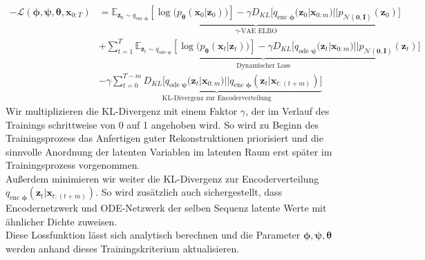 \documentclass[12pt]{article}
\newcommand{\E}{\mathbb{E}}
\newcommand{\z}{\mathbf{z}}
\begin{document}
	\begin{align*}
	-\mathcal{L}(\boldsymbol\phi,\boldsymbol\psi,\boldsymbol\theta,\mathbf{x}_{0:T}) &=\underbrace{\E_{\mathbf{z}_{0}\sim q_{\text{enc }\boldsymbol\phi}}
		\left[\log\big(p_{\boldsymbol\theta}\left(\mathbf{x}_{0}|\mathbf{z}_{0}\right)\big)\right] - \gamma D_{KL}\big[q_{\text{enc }\boldsymbol\phi}(\mathbf{z}_{0}|\mathbf{x}_{0:m})||p_{\mathcal{N}(\mathbf{0},\mathbf{I})}(\z_0)\big]}_{\gamma\text{-VAE ELBO}}\\ &+ \underbrace{\sum_{t=1}^T \E_{\mathbf{z}_{t}\sim q_{\text{ode }\boldsymbol\psi}}
		\left[\log\big(p_{\boldsymbol\theta}\left(\mathbf{x}_{t}|\mathbf{z}_{t}\right)\big)\right] - \gamma D_{KL}\big[q_{\text{ode }\boldsymbol\psi}(\mathbf{z}_{t}|\mathbf{x}_{0:m})||p_{\mathcal{N}(\mathbf{0},\mathbf{I})}(\z_t)\big]}_{\text{Dynamischer Loss}} \\ &- \gamma \underbrace{\sum_{t=0}^{T-m} D_{KL}\big[q_{\text{ode }\boldsymbol\psi}(\mathbf{z}_{t}|\mathbf{x}_{0:m})||q_{\text{enc }\boldsymbol\phi}(\mathbf{z}_{t}|\mathbf{x}_{t:(t+m)})\big]}_{\text{KL-Divergenz zur Encoderverteilung}}
	\end{align*}
	Wir multiplizieren die KL-Divergenz mit einem Faktor $\gamma$, der im Verlauf des Trainings schrittweise von 0 auf 1 angehoben wird. So wird zu Beginn des Trainingsprozess das Anfertigen guter Rekonstruktionen priorisiert und die sinnvolle
	Anordnung der latenten Variablen im latenten Raum erst später im Trainingsprozess vorgenommen.\\
	Außerdem minimieren wir weiter die KL-Divergenz zur Encoderverteilung $q_{\text{enc }\boldsymbol\phi}(\mathbf{z}_{t}|\mathbf{x}_{t:(t+m)})$. So wird zusätzlich auch sichergestellt, dass Encodernetzwerk und ODE-Netzwerk der selben Sequenz latente Werte mit ähnlicher Dichte zuweisen.\\
	Diese Lossfunktion lässt sich analytisch berechnen und die Parameter $\boldsymbol\phi,\boldsymbol\psi,\boldsymbol\theta$ werden anhand dieses Trainingskriterium aktualisieren.\\
\end{document}
